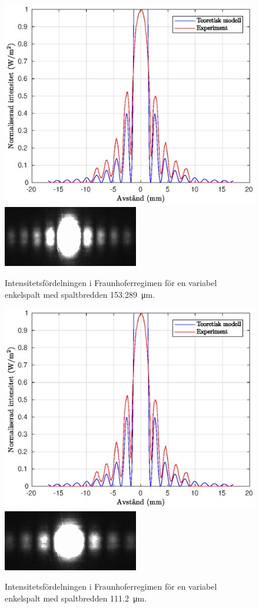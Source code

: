 \documentclass[a4paper]{article}
\begin{document}
\begin{figure}[h!]
	\centering
	\includegraphics[width=0.75\linewidth]{Data/Figurer/variabelEnkelspalt1.eps}
	\includegraphics[width=0.5\linewidth]{Data/Figurer/variabelEnkelspalt1.png}
	\caption{Intensitetsfördelningen i Fraunhoferregimen för en variabel enkelspalt med spaltbredden \SI{153.289}{\micro\m}.}
	\label{fig:variabelEnkelspalt1}
\end{figure}

\begin{figure}[h!]
	\centering
	\includegraphics[width=0.75\linewidth]{Data/Figurer/variabelEnkelspalt1.eps}
	\includegraphics[width=0.5\linewidth]{Data/Figurer/variabelEnkelspalt2.png}
	\caption{Intensitetsfördelningen i Fraunhoferregimen för en variabel enkelspalt med spaltbredden \SI{111.2}{\micro\m}.}
	\label{fig:variabelEnkelspalt2}
\end{figure}
\end{document}
